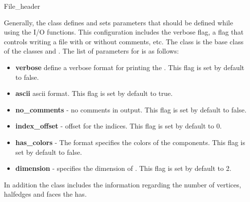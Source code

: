 
\ccRefPageBegin


\renewcommand{\ccRefPageBegin}{\begin{ccAdvanced}}
\renewcommand{\ccRefPageEnd}{\end{ccAdvanced}}

\begin{ccRefClass}{File_header}


\ccDefinition
Generally, the \ccRefName \/ class defines and sets parameters that
should be defined while using the I/O functions.  This configuration
includes the verbose flag, a flag that controls writing a file with or
without comments, etc.  The class is the base class of the classes
 and .  The list of
parameters for \ccRefName\/ is as follows:

\begin{itemize}
\item {\bf verbose } define a verbose format for printing the . This flag is set by default to false.
\item {\bf ascii} ascii format. This flag is set by default to true.
\item {\bf no\_comments} - no comments in output. This flag is set by default to false.
\item {\bf index\_offset} - offset for the indices. This flag is set by default to 0.
\item {\bf has\_colors} - The format specifies the colors of the  components. This flag is set by default to false.
\item {\bf dimension} - specifies the dimension of . This flag is set by default to 2.
\end{itemize}

In addition the \ccRefName \/ class includes the information regarding the 
number of vertices, halfedges and faces the  has.


\end{ccRefClass}
